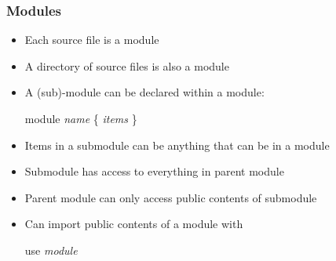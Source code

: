 \documentclass[12pt]{beamer}
\begin{document}
\begin{frame}[fragile]
\frametitle{Modules}
\begin{itemize}
\item Each source file is a module
\item A directory of source files is also a module
\item A (sub)-module can be declared within a module: \\[-1ex]
  \begin{minipage}{0.95\linewidth}
    \begin{block}{}
\begin{semiverbatim}
module \emph{name} \{
    \emph{items}
\}
\end{semiverbatim}
    \end{block}
  \end{minipage}
\item Items in a submodule can be anything that can be in a module
\item Submodule has access to everything in parent module
\item Parent module can only access public contents of submodule
\item Can import public contents of a module with \\[-1ex]
  \begin{minipage}{0.95\linewidth}
    \begin{block}{}
\begin{semiverbatim}
use \emph{module}
\end{semiverbatim}
    \end{block}
  \end{minipage}
\end{itemize}
\end{frame}
\end{document}
